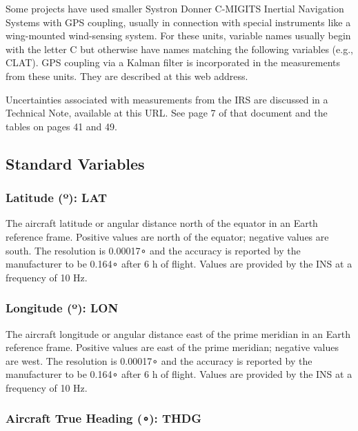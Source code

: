 \documentclass[
  english,
]{book}
\begin{document}
Some projects have used smaller Systron Donner C-MIGITS Inertial Navigation Systems with GPS coupling, usually in connection with special instruments like a wing-mounted wind-sensing system. For these units, variable names usually begin with the letter C but otherwise have names matching the following variables (e.g., CLAT). GPS coupling via a Kalman filter is incorporated in the measurements from these units. They are described at this web address.

Uncertainties associated with measurements from the IRS are discussed in a Technical Note, available at this URL. See page 7 of that document and the tables on pages 41 and 49.

\hypertarget{standard-variables}{%
\subsection{Standard Variables}\label{standard-variables}}

\hypertarget{latitude}{%
\subsubsection*{\texorpdfstring{Latitude ({º}): LAT}{Latitude (º): LAT}}\label{latitude}}

The aircraft latitude or angular distance north of the equator in an Earth reference frame. Positive values are north of the equator; negative values are south. The resolution is 0.00017{∘} and the accuracy is reported by the manufacturer to be 0.164{∘} after 6 h of flight. Values are provided by the INS at a frequency of 10 Hz.

\hypertarget{longitude}{%
\subsubsection*{\texorpdfstring{Longitude ({º}): LON}{Longitude (º): LON}}\label{longitude}}

The aircraft longitude or angular distance east of the prime meridian in an Earth reference frame. Positive values are east of the prime meridian; negative values are west. The resolution is 0.00017{∘} and the accuracy is reported by the manufacturer to be 0.164{∘} after 6 h of flight. Values are provided by the INS at a frequency of 10 Hz.

\hypertarget{thdg}{%
\subsubsection*{\texorpdfstring{Aircraft True Heading ({∘}): THDG}{Aircraft True Heading (∘): THDG}}\label{thdg}}
\end{document}
